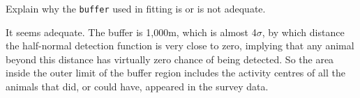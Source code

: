 \begin{questions}
\begin{parts}
{\begin{solution}
\end{solution}}

\item Explain why the \verb|buffer| used in fitting is or is not adequate.

{\begin{solution}
It seems adequate. The buffer is 1,000m, which is almost 4$\sigma$, by which distance the half-normal detection function is very close to zero, implying that any animal beyond this distance has virtually zero chance of being detected. So the area inside the outer limit of the buffer region includes the activity centres of all the animals that did, or could have, appeared in the survey data.

\end{solution}}

\end{parts}

\end{questions}


